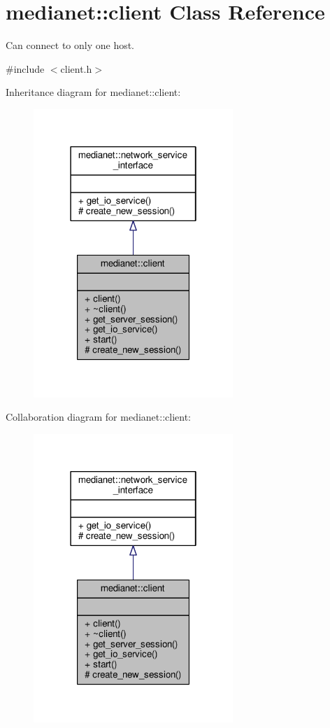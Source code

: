 \hypertarget{classmedianet_1_1client}{}\section{medianet\+::client Class Reference}
\label{classmedianet_1_1client}


Can connect to only one host.  




{\ttfamily \#include $<$client.\+h$>$}



Inheritance diagram for medianet\+::client\+:
\nopagebreak
\begin{figure}[H]
\begin{center}
\leavevmode
\includegraphics[width=214pt]{classmedianet_1_1client__inherit__graph}
\end{center}
\end{figure}


Collaboration diagram for medianet\+::client\+:
\nopagebreak
\begin{figure}[H]
\begin{center}
\leavevmode
\includegraphics[width=214pt]{classmedianet_1_1client__coll__graph}
\end{center}
\end{figure}
